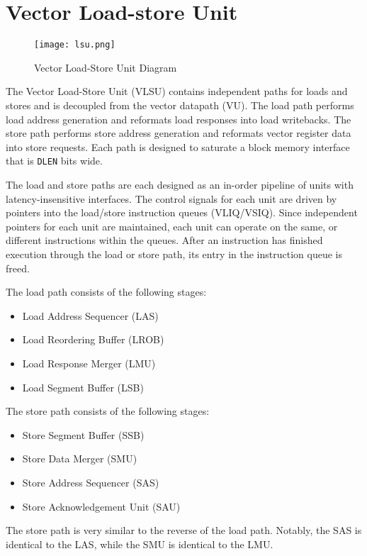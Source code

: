\newpage
\section{Vector Load-store Unit}
\label{sec:memory}

\begin{figure}[h]
  \centering
  \texttt{[image: lsu.png]}
  \caption{Vector Load-Store Unit Diagram}
  \label{fig:lsu}
\end{figure}

The Vector Load-Store Unit (VLSU) contains independent paths for loads and stores and is decoupled from the vector datapath (VU).
The load path performs load address generation and reformats load responses into load writebacks.
The store path performs store address generation and reformats vector register data into store requests.
Each path is designed to saturate a block memory interface that is \texttt{DLEN} bits wide.

The load and store paths are each designed as an in-order pipeline of units with latency-insensitive interfaces.
The control signals for each unit are driven by pointers into the load/store instruction queues (VLIQ/VSIQ).
Since independent pointers for each unit are maintained, each unit can operate on the same, or different instructions within the queues.
After an instruction has finished execution through the load or store path, its entry in the instruction queue is freed.

The load path consists of the following stages:

\begin{itemize}
\item Load Address Sequencer (LAS)
\item Load Reordering Buffer (LROB)
\item Load Response Merger (LMU)
\item Load Segment Buffer (LSB)
\end{itemize}
 
The store path consists of the following stages:

\begin{itemize}
\item Store Segment Buffer (SSB)
\item Store Data Merger (SMU)
\item Store Address Sequencer (SAS)
\item Store Acknowledgement Unit (SAU)
\end{itemize}
 
The store path is very similar to the reverse of the load path.
Notably, the SAS is identical to the LAS, while the SMU is identical to the LMU.

